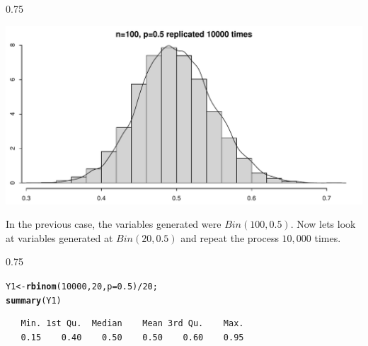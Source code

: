 \documentclass{beamer}\usepackage[]{graphicx}\usepackage[]{color}
\makeatletter
\newcommand{\hlnum}[1]{\textcolor[rgb]{0.2,0.2,0.2}{#1}}%
\newcommand{\hlopt}[1]{\textcolor[rgb]{0.102,0.102,0.102}{#1}}%
\newcommand{\hlstd}[1]{\textcolor[rgb]{0.102,0.102,0.102}{#1}}%
\newcommand{\hlkwb}[1]{\textcolor[rgb]{0.102,0.102,0.102}{#1}}%
\newcommand{\hlkwc}[1]{\textcolor[rgb]{0.2,0.2,0.2}{#1}}%
\newcommand{\hlkwd}[1]{\textcolor[rgb]{0.102,0.102,0.102}{\textbf{#1}}}%
\newenvironment{kframe}{%
 \def\at@end@of@kframe{}%
 \ifinner\ifhmode%
  \def\at@end@of@kframe{\end{minipage}}%
  \begin{minipage}{\columnwidth}%
 \fi\fi%
 \def\FrameCommand##1{\hskip\@totalleftmargin \hskip-\fboxsep
 \colorbox{shadecolor}{##1}\hskip-\fboxsep
     \hskip-\linewidth \hskip-\@totalleftmargin \hskip\columnwidth}%
 \MakeFramed {\advance\hsize-\width
   \@totalleftmargin\z@ \linewidth\hsize
   \@setminipage}}%
 {\par\unskip\endMakeFramed%
 \at@end@of@kframe}
\newenvironment{knitrout}{}{} %
\renewenvironment{knitrout}{\begin{spacing}{0.75}\begin{tiny}}{\end{tiny}\end{spacing}}
\makeatother
\begin{document}
\begin{frame}[fragile]

\begin{knitrout}\small
{}\color{fgcolor}

{\centering \includegraphics[width=0.89\linewidth]{figure/graphics-unnamed-chunk-13-1} 

}



\end{knitrout}

\end{frame}

\begin{frame}[fragile]

In the previous case, the variables generated were $Bin(100,0.5)$. Now lets look at variables generated at $Bin(20,0.5)$ and repeat the process $10,000$ times.

\begin{knitrout}\small
{}\color{fgcolor}\begin{kframe}
\begin{alltt}
\hlstd{Y1} \hlkwb{<-} \hlkwd{rbinom}\hlstd{(}\hlnum{10000}\hlstd{,} \hlnum{20}\hlstd{,} \hlkwc{p}\hlstd{=}\hlnum{0.5}\hlstd{)}\hlopt{/} \hlnum{20}\hlstd{;}
\hlkwd{summary}\hlstd{(Y1)}
\end{alltt}
\begin{verbatim}
   Min. 1st Qu.  Median    Mean 3rd Qu.    Max. 
   0.15    0.40    0.50    0.50    0.60    0.95 
\end{verbatim}
\end{kframe}
\end{knitrout}

\end{frame}
\end{document}

